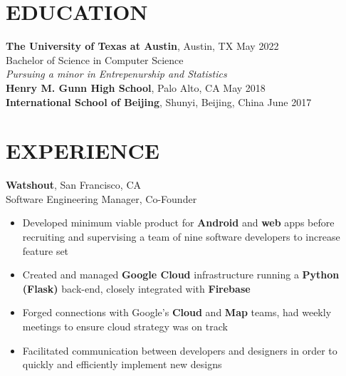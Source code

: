 \documentclass{res}
\newcommand\tab[1][1cm]{\hspace*{#1}}
\begin{document}
\makeatletter
\def\@tablebox#1{\begin{tabular}[t]{@{}c@{}}#1\end{tabular}}
\makeatother

\address{ethan.houston@utexas.edu | linkedin.com/in/ethanhouston | github.com/ethanzh \\ Palo Alto, CA | 650-804-1750}

\begin{resume}

\section{EDUCATION}
	\textbf{The University of Texas at Austin}, Austin, TX \hfill May 2022 \\[2pt]
	Bachelor of Science in Computer Science  \\
    	\tab \textit{Pursuing a minor in Entrepenurship and Statistics} \\[4pt]
    	\textbf{Henry M. Gunn High School}, Palo Alto, CA \hfill May 2018 \\[4pt]
     	\textbf{International School of Beijing}, Shunyi, Beijing, China \hfill June 2017

\section{EXPERIENCE}
	\textbf{Watshout}, San Francisco, CA \\
	Software Engineering Manager, Co-Founder
	\begin{itemize}
	\item Developed minimum viable product for \textbf{Android} and \textbf{web} apps before recruiting and 
		supervising a team of nine software developers to increase feature set
	\item Created and managed \textbf{Google Cloud} infrastructure running a \textbf{Python (Flask)} back-end, closely
		integrated with \textbf{Firebase}
	\item Forged connections with Google’s \textbf{Cloud} and \textbf{Map} teams, had weekly meetings to ensure 
		cloud strategy was on track
	\item Facilitated communication between developers and designers in order to quickly and efficiently
		implement new designs  


\end{itemize}
\end{resume}
\end{document}
